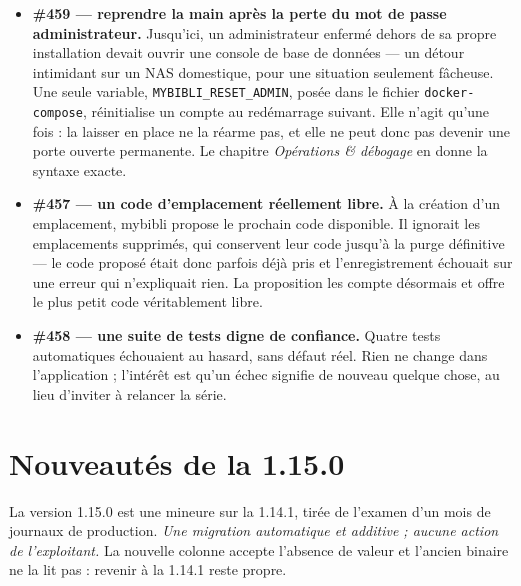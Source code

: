 \begin{itemize}
        Une réserve qu'il vaut mieux énoncer franchement : il subsiste
        un résidu de titres qu'aucune bibliothèque consultée ne
        possède \string— des ouvrages de petits éditeurs ou
        autoédités, britanniques pour la plupart. Six catalogues ont
        désormais été essayés sur eux. Pour ceux-là, les champs sont à
        saisir à la main ; aucune mise à jour n'y changera rien.
  \item \textbf{\#459 \string— reprendre la main après la perte du mot
        de passe administrateur.} Jusqu'ici, un administrateur enfermé
        dehors de sa propre installation devait ouvrir une console de
        base de données \string— un détour intimidant sur un NAS
        domestique, pour une situation seulement fâcheuse. Une seule
        variable, \texttt{MYBIBLI\_RESET\_ADMIN}, posée dans le fichier
        \texttt{docker-compose}, réinitialise un compte au redémarrage
        suivant. Elle n'agit qu'une fois : la laisser en place ne la
        réarme pas, et elle ne peut donc pas devenir une porte ouverte
        permanente. Le chapitre \emph{Opérations \& débogage} en donne la
        syntaxe exacte.
  \item \textbf{\#457 \string— un code d'emplacement réellement
        libre.} À la création d'un emplacement, mybibli propose le
        prochain code disponible. Il ignorait les emplacements
        supprimés, qui conservent leur code jusqu'à la purge
        définitive \string— le code proposé était donc parfois déjà
        pris et l'enregistrement échouait sur une erreur qui
        n'expliquait rien. La proposition les compte désormais et
        offre le plus petit code véritablement libre.
  \item \textbf{\#458 \string— une suite de tests digne de confiance.}
        Quatre tests automatiques échouaient au hasard, sans défaut
        réel. Rien ne change dans l'application ; l'intérêt est qu'un
        échec signifie de nouveau quelque chose, au lieu d'inviter à
        relancer la série.
\end{itemize}

\section{Nouveautés de la 1.15.0}\label{sec:whats-new-1.15.0}

La version 1.15.0 est une mineure sur la 1.14.1, tirée de l'examen d'un
mois de journaux de production. \emph{Une migration automatique et
additive ; aucune action de l'exploitant.} La nouvelle colonne accepte
l'absence de valeur et l'ancien binaire ne la lit pas : revenir à la
1.14.1 reste propre.

